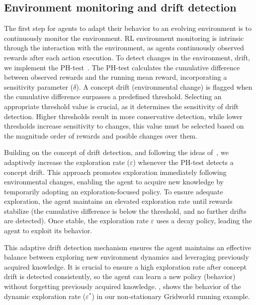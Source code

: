 \subsection{Environment monitoring and drift detection}

The first step for agents to adapt their behavior to an evolving environment is to continuously monitor 
the environment. \ac{RL} environment monitoring is intrinsic through the interaction with the 
environment, as agents continuously observed rewards after each action execution. To detect 
changes in the environment, \ie drift, we implement the 
PH-test~\cite{mignon2017adaptive,networkdynamicrl}. The PH-test calculates the cumulative 
difference between observed rewards and the running mean reward, incorporating a sensitivity 
parameter ($\delta$). A concept drift (environmental change) is flagged when the cumulative 
difference surpasses a predefined threshold. Selecting an appropriate threshold value is crucial, as it 
determines the sensitivity of drift detection. Higher thresholds result in more conservative detection, 
while lower thresholds increase sensitivity to changes, this value must be selected based on the 
magnitude order of rewards and posible changes over them.

Building on the concept of drift detection, and following the ideas of~\citet{mignon2017adaptive}, 
we adaptively increase the exploration rate ($\varepsilon$) whenever the PH-test detects a concept 
drift. This approach promotes exploration immediately following environmental changes, enabling 
the agent to acquire new knowledge by temporarily adopting an exploration-focused policy. To 
ensure adequate exploration, the agent maintains an elevated exploration rate until rewards 
stabilize (\ie the cumulative difference is below the threshold, and  no further drifts are detected). 
Once stable, the exploration rate $\varepsilon$ uses a decay policy, leading the agent to exploit its 
behavior.

This adaptive drift detection mechanism ensures the agent maintains an effective balance between 
exploring new environment dynamics and leveraging previously acquired knowledge. It is crucial to 
ensure a high exploration rate after concept drift is detected consistently, so the agent can learn a 
new policy (\ie behavior) without forgetting previously acquired knowledge. , 
shows the behavior of the dynamic exploration rate ($\varepsilon^*$) in our non-stationary Gridworld 
running example.

